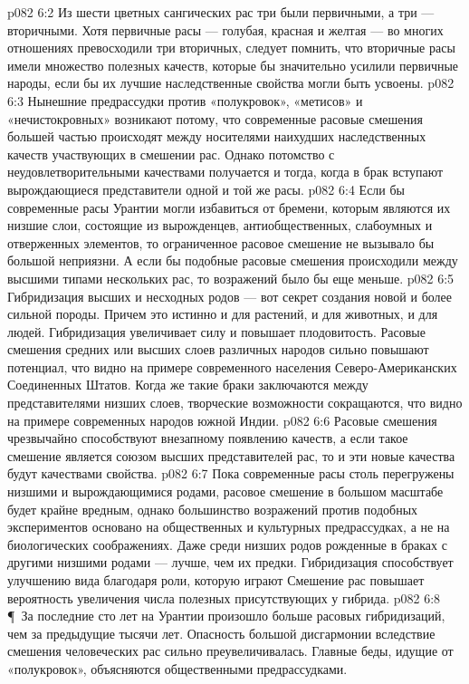 \vs p082 6:2 Из шести цветных сангических рас три были первичными, а три --- вторичными. Хотя первичные расы --- голубая, красная и желтая --- во многих отношениях превосходили три вторичных, следует помнить, что вторичные расы имели множество полезных качеств, которые бы значительно усилили первичные народы, если бы их лучшие наследственные свойства могли быть усвоены.
\vs p082 6:3 Нынешние предрассудки против «полукровок», «метисов» и «нечистокровных» возникают потому, что современные расовые смешения большей частью происходят между носителями наихудших наследственных качеств участвующих в смешении рас. Однако потомство с неудовлетворительными качествами получается и тогда, когда в брак вступают вырождающиеся представители одной и той же расы.
\vs p082 6:4 Если бы современные расы Урантии могли избавиться от бремени, которым являются их низшие слои, состоящие из вырожденцев, антиобщественных, слабоумных и отверженных элементов, то ограниченное расовое смешение не вызывало бы большой неприязни. А если бы подобные расовые смешения происходили между высшими типами нескольких рас, то возражений было бы еще меньше.
\vs p082 6:5 Гибридизация высших и несходных родов --- вот секрет создания новой и более сильной породы. Причем это истинно и для растений, и для животных, и для людей. Гибридизация увеличивает силу и повышает плодовитость. Расовые смешения средних или высших слоев различных народов сильно повышают  потенциал, что видно на примере современного населения Северо\hyp{}Американских Соединенных Штатов. Когда же такие браки заключаются между представителями низших слоев, творческие возможности сокращаются, что видно на примере современных народов южной Индии.
\vs p082 6:6 Расовые смешения чрезвычайно способствуют внезапному появлению  качеств, а если такое смешение является союзом высших представителей рас, то и эти новые качества будут качествами  свойства.
\vs p082 6:7 Пока современные расы столь перегружены низшими и вырождающимися родами, расовое смешение в большом масштабе будет крайне вредным, однако большинство возражений против подобных экспериментов основано на общественных и культурных предрассудках, а не на биологических соображениях. Даже среди низших родов рожденные в браках с другими низшими родами --- лучше, чем их предки. Гибридизация способствует улучшению вида благодаря роли, которую играют  Смешение рас повышает вероятность увеличения числа полезных  присутствующих у гибрида.
\vs p082 6:8 \P\ За последние сто лет на Урантии произошло больше расовых гибридизаций, чем за предыдущие тысячи лет. Опасность большой дисгармонии вследствие смешения человеческих рас сильно преувеличивалась. Главные беды, идущие от «полукровок», объясняются общественными предрассудками.

